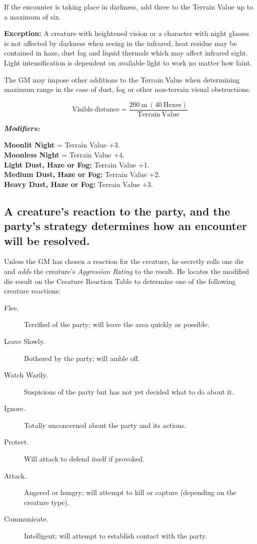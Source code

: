 If the encounter is taking place in darkness, add three to the Terrain
Value up to a maximum of six.

\textbf{Exception:} A creature with heightened vision or a character
with night glasses is not affected by darkness when seeing in the
infrared, heat residue may be contained in haze, dust fog and liquid
thermals which may affect infrared sight. Light intensification is
dependent on available light to work no matter how faint.

The GM may impose other additions to the Terrain Value when
determining maximum range in the case of dust, fog or other
non-terrain visual obstructions.

$$\mathrm{Visible~distance} =
\frac{200\mathrm{~m~(40~Hexes)}}{\mathrm{Terrain~Value}}$$

\noindent\textbf{\emph{Modifiers:}}
 
\noindent\textbf{Moonlit Night} = Terrain Value +3.\\
\textbf{Moonless Night} = Terrain Value +4.\\
\textbf{Light Dust, Haze or Fog:} Terrain Value +1.\\
\textbf{Medium Dust, Haze or Fog:} Terrain Value +2.\\
\textbf{Heavy Dust, Haze or Fog:} Terrain Value +3.

\subsection[Creature Reactions]{A creature's reaction to the party,
  and the party's 
  strategy determines how an encounter will be resolved.}
\label{sec:creature-reaction}



Unless the GM has chosen a reaction for the creature, he secretly
rolls one die and \emph{adds} the creature's
\emph{Aggression Rating}
to the result. He locates the modified die result on the Creature
Reaction Table to determine one of the following creature reactions:

\begin{description}
\item[Flee.] Terrified of the party; will leave the area quickly as
  possible.
\item[Leave Slowly.] Bothered by the party; will amble off.
\item[Watch Warily.] Suspicious of the party but has not yet decided
  what to do about it.
\item[Ignore.] Totally unconcerned about the party and its actions.
\item[Protect.] Will attack to defend itself if provoked.
\item[Attack.] Angered or hungry; will attempt to kill or capture
  (depending on the creature type).
\item[Communicate.] Intelligent; will attempt to establish contact
  with the party.
\end{description}

